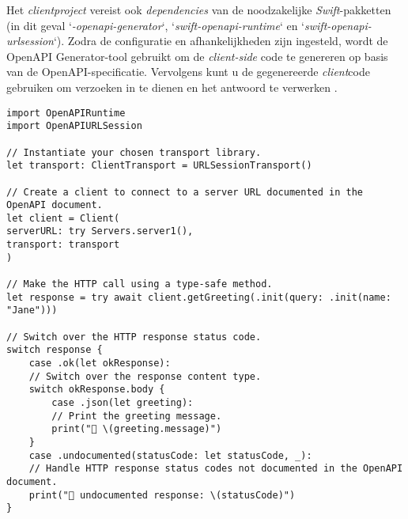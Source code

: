 Het \textit{clientproject} vereist ook \textit{dependencies} van de noodzakelijke \textit{Swift}-pakketten (in dit geval `\textit{-openapi-generator}`, `\textit{swift-openapi-runtime}` en `\textit{swift-openapi-urlsession}`). Zodra de configuratie en afhankelijkheden zijn ingesteld, wordt de OpenAPI Generator-tool gebruikt om de \textit{client-side} code te genereren op basis van de OpenAPI-specificatie. Vervolgens kunt u de gegenereerde \textit{client}code \\gebruiken om verzoeken in te dienen en het antwoord te verwerken \autocite{2024a}.
\begin{lstlisting}[caption=Using generated API Server Stubs]
import OpenAPIRuntime
import OpenAPIURLSession

// Instantiate your chosen transport library.
let transport: ClientTransport = URLSessionTransport()

// Create a client to connect to a server URL documented in the OpenAPI document.
let client = Client(
serverURL: try Servers.server1(),
transport: transport
)

// Make the HTTP call using a type-safe method.
let response = try await client.getGreeting(.init(query: .init(name: "Jane")))

// Switch over the HTTP response status code.
switch response {
    case .ok(let okResponse):
    // Switch over the response content type.
    switch okResponse.body {
        case .json(let greeting):
        // Print the greeting message.
        print("👋 \(greeting.message)")
    }
    case .undocumented(statusCode: let statusCode, _):
    // Handle HTTP response status codes not documented in the OpenAPI document.
    print("🥺 undocumented response: \(statusCode)")
}
\end{lstlisting}